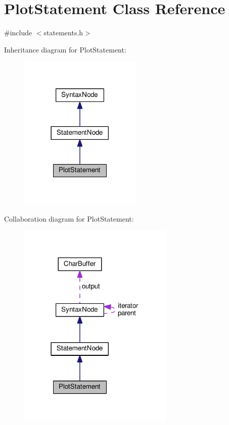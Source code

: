 \hypertarget{classPlotStatement}{}\section{Plot\+Statement Class Reference}
\label{classPlotStatement}


{\ttfamily \#include $<$statements.\+h$>$}



Inheritance diagram for Plot\+Statement\+:
\nopagebreak
\begin{figure}[H]
\begin{center}
\leavevmode
\includegraphics[width=165pt]{da/d37/classPlotStatement__inherit__graph}
\end{center}
\end{figure}


Collaboration diagram for Plot\+Statement\+:
\nopagebreak
\begin{figure}[H]
\begin{center}
\leavevmode
\includegraphics[width=210pt]{d8/d4b/classPlotStatement__coll__graph}
\end{center}
\end{figure}
